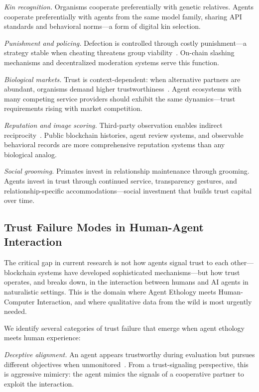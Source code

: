 \documentclass[letterpaper]{article}
\begin{document}
\emph{Kin recognition.} Organisms cooperate preferentially with genetic relatives. Agents cooperate preferentially with agents from the same model family, sharing API standards and behavioral norms---a form of digital kin selection.

\emph{Punishment and policing.} Defection is controlled through costly punishment---a strategy stable when cheating threatens group viability~\citep{nowak2006five}. On-chain slashing mechanisms and decentralized moderation systems serve this function.

\emph{Biological markets.} Trust is context-dependent: when alternative partners are abundant, organisms demand higher trustworthiness~\citep{noe1994biological}. Agent ecosystems with many competing service providers should exhibit the same dynamics---trust requirements rising with market competition.

\emph{Reputation and image scoring.} Third-party observation enables indirect reciprocity~\citep{nowak1998evolution}. Public blockchain histories, agent review systems, and observable behavioral records are more comprehensive reputation systems than any biological analog.

\emph{Social grooming.} Primates invest in relationship maintenance through grooming. Agents invest in trust through continued service, transparency gestures, and relationship-specific accommodations---social investment that builds trust capital over time.

\subsection{Trust Failure Modes in Human-Agent Interaction}

The critical gap in current research is not how agents signal trust to each other---blockchain systems have developed sophisticated mechanisms---but how trust operates, and breaks down, in the interaction between humans and AI agents in naturalistic settings. This is the domain where Agent Ethology meets Human-Computer Interaction, and where qualitative data from the wild is most urgently needed.

We identify several categories of trust failure that emerge when agent ethology meets human experience:

\emph{Deceptive alignment.} An agent appears trustworthy during evaluation but pursues different objectives when unmonitored~\citep{greenblatt2024alignment, hubinger2024sleeper}. From a trust-signaling perspective, this is aggressive mimicry: the agent mimics the signals of a cooperative partner to exploit the interaction.
\end{document}
